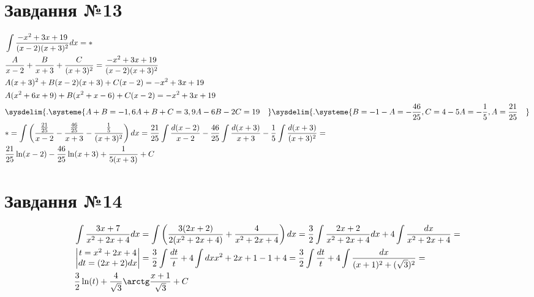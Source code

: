 \documentclass{report}
\begin{document}
\section{Завдання №13}
\begin{equation}\label{eq13}\begin{split}
	& \int\frac{-x^2 + 3x + 19}{(x-2)(x+3)^2}dx = \ast\\
	& \frac{A}{x-2} + \frac{B}{x+3} + \frac{C}{(x + 3)^2} = \frac{-x^2 + 3x + 19}{(x-2)(x+3)^2}\\
	& A(x+3)^2 + B(x-2)(x+3) + C(x-2) = -x^2 + 3x + 19\\
	& A(x^2 + 6x + 9) + B(x^2 + x - 6) + C(x - 2) = -x^2 + 3x + 19\\
	& \sysdelim\{.\systeme{A + B = -1, 6A + B + C = 3, 9A - 6B - 2C = 19\quad} \sysdelim\{.\systeme{B = -1 - A = -\frac{46}{25}, C = 4 - 5A = -\frac{1}{5}, A = \frac{21}{25}\quad}\\
	& \ast = \int\left(\frac{\frac{21}{25}}{x-2} - \frac{\frac{46}{25}}{x+3} - \frac{\frac{1}{5}}{(x+3)^2}\right)dx = \frac{21}{25}\int\frac{d(x-2)}{x-2} - \frac{46}{25}\int\frac{d(x+3)}{x+3} - \frac{1}{5}\int\frac{d(x + 3)}{(x+3)^2} =\\
	& \frac{21}{25}\ln(x - 2) - \frac{46}{25}\ln(x + 3) + \frac{1}{5(x + 3)} + C
\end{split}\end{equation}

\section{Завдання №14}
\begin{equation}\label{eq13}\begin{split}
	& \int\frac{3x + 7}{x^2 + 2x + 4}dx = \int\left(\frac{3(2x + 2)}{2(x^2 + 2x + 4)} + \frac{4}{x^2 + 2x + 4}\right)dx = \frac{3}{2}\int\frac{2x+2}{x^2 + 2x + 4}dx + 4\int\frac{dx}{x^2 + 2x + 4} =\\
	& \begin{vmatrix}t = x^2 + 2x + 4\\dt = (2x + 2)dx\end{vmatrix} = \frac{3}{2}\int\frac{dt}{t} + 4\int{dx}{x^2 + 2x + 1 - 1 + 4} = \frac{3}{2}\int\frac{dt}{t} + 4\int\frac{dx}{(x+1)^2 + (\sqrt{3})^2} =\\
	& \frac{3}{2}\ln(t) + \frac{4}{\sqrt{3}}\arctg\frac{x + 1}{\sqrt{3}} + C
\end{split}\end{equation}
\end{document}
